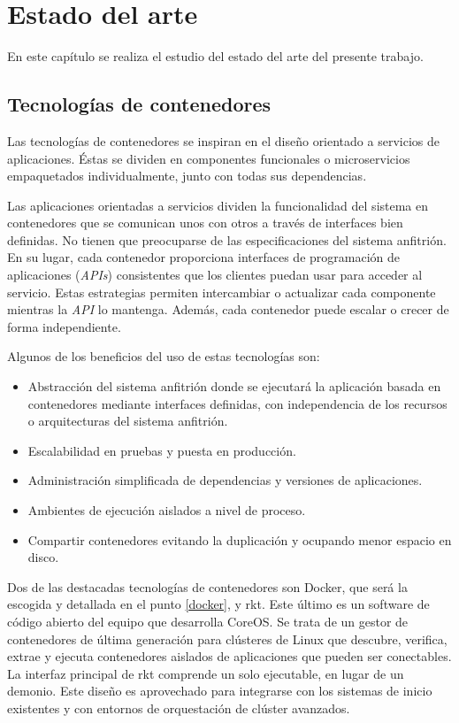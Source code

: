 \chapter{Estado del arte}
\label{cha:state_of_art}

En este capítulo se realiza el estudio del estado del arte del presente trabajo.

\section{Tecnologías de contenedores}

Las tecnologías de contenedores se inspiran en el diseño orientado a servicios de aplicaciones. Éstas se dividen en componentes funcionales o microservicios empaquetados individualmente, junto con todas sus dependencias.

Las aplicaciones orientadas a servicios dividen la funcionalidad del sistema en contenedores que se comunican unos con otros a través de interfaces bien definidas. No tienen que preocuparse de las especificaciones del sistema anfitrión. En su lugar, cada contenedor proporciona interfaces de programación de aplicaciones (\textit{APIs}) consistentes que los clientes puedan usar para acceder al servicio. Estas estrategias permiten intercambiar o actualizar cada componente mientras la \textit{API} lo mantenga. Además, cada contenedor puede escalar o crecer de forma independiente.

Algunos de los beneficios del uso de estas tecnologías son:
\begin{itemize}
\item Abstracción del sistema anfitrión donde se ejecutará la aplicación basada en contenedores mediante interfaces definidas, con independencia de los recursos o arquitecturas del sistema anfitrión.
\item Escalabilidad en pruebas y puesta en producción.
\item Administración simplificada de dependencias y versiones de aplicaciones.
\item Ambientes de ejecución aislados a nivel de proceso.
\item Compartir contenedores evitando la duplicación y ocupando menor espacio en disco.
\end{itemize}

Dos de las destacadas tecnologías de contenedores son Docker\cite{docker}, que será la escogida y detallada en el punto \hyperref[docker]{\ref{docker}}, y rkt\cite{rkt}. Este último es un software de código abierto del equipo que desarrolla CoreOS\cite{masteringcoreos}. Se trata de un gestor de contenedores de última generación para clústeres de Linux que descubre, verifica, extrae y ejecuta contenedores aislados de aplicaciones que pueden ser conectables. La interfaz principal de rkt comprende un solo ejecutable, en lugar de un demonio. Este diseño es aprovechado para integrarse con los sistemas de inicio existentes y con entornos de orquestación de clúster avanzados.

